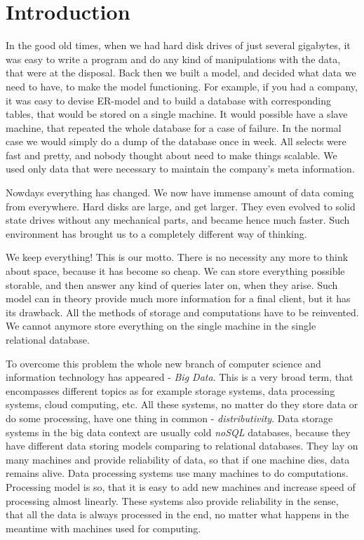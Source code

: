 \chapter{Introduction}
\label{chap:introduction}

In the good old times, when we had hard disk drives of just several gigabytes, it was easy to write a program and do any kind of manipulations with the data, that were at the disposal.
Back then we built a model, and decided what data we need to have, to make the model functioning.
For example, if you had a company, it was easy to devise ER-model and to build a database with corresponding tables, that would be stored on a single machine.
It would possible have a slave machine, that repeated the whole database for a case of failure.
In the normal case we would simply do a dump of the database once in week.
All selects were fast and pretty, and nobody thought about need to make things scalable.
We used only data that were necessary to maintain the company's meta information.

Nowdays everything has changed.
We now have immense amount of data coming from everywhere.
Hard disks are large, and get larger.
They even evolved to solid state drives without any mechanical parts, and became hence much faster.
Such environment has brought us to a completely different way of thinking.

We keep everything!
This is our motto.
There is no necessity any more to think about space, because it has become so cheap.
We can store everything possible storable, and then answer any kind of queries later on, when they arise.
Such model can in theory provide much more information for a final client, but it has its drawback.
All the methods of storage and computations have to be reinvented.
We cannot anymore store everything on the single machine in the single relational database.

To overcome this problem the whole new branch of computer science and information technology has appeared - \textit{Big Data}.
This is a very broad term, that encompasses different topics as for example storage systems, data processing systems, cloud computing, etc.
All these systems, no matter do they store data or do some processing, have one thing in common - \textit{distributivity}.
Data storage systems in the big data context are usually cold \textit{noSQL} databases, because they have different data storing models comparing to relational databases.
They lay on many machines and provide reliability of data, so that if one machine dies, data remains alive.
Data processing systems use many machines to do computations.
Processing model is so, that it is easy to add new machines and increase speed of processing almost linearly.
These systems also provide reliability in the sense, that all the data is always processed in the end, no matter what happens in the meantime with machines used for computing.

